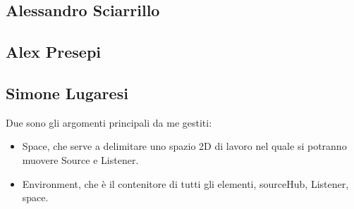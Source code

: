 \documentclass[a4paper,12pt]{report}
\begin{document}
\subsection*{Alessandro Sciarrillo}
\subsection*{Alex Presepi}
\subsection*{Simone Lugaresi}
Due sono gli argomenti principali da me gestiti:
\begin{itemize}
	\item Space, che serve a delimitare uno spazio 2D di lavoro nel quale si potranno muovere Source e Listener.
	\item Environment, che è il contenitore di tutti gli elementi, sourceHub, Listener, space.
\end{itemize}
\end{document}
